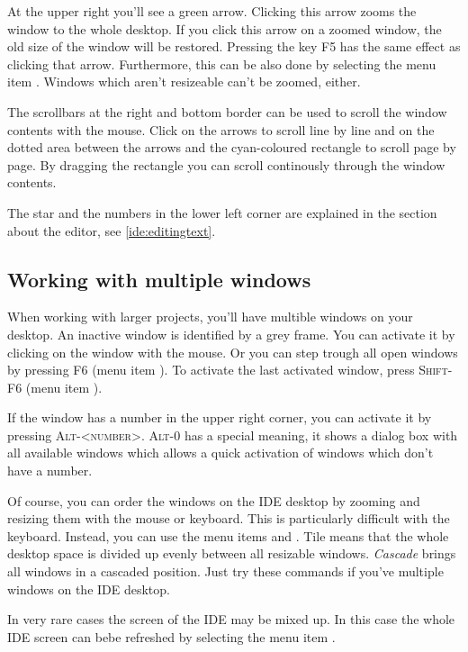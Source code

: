 At the upper right you'll see a green arrow. Clicking this arrow
zooms the window to the whole desktop. If you click this arrow on
a zoomed window, the old size of the window will be restored. Pressing
the key \textsc{F5} has the same effect as clicking that arrow. Furthermore,
this can be also done by selecting the menu item .
Windows which aren't resizeable can't be zoomed, either.

The scrollbars at the right and bottom border can be used to scroll
the window contents with the mouse. Click on the arrows to scroll
line by line and on the dotted area between the arrows and the
cyan-coloured
rectangle to scroll page by page. By dragging the rectangle you can
scroll continously through the window contents.

The star and the numbers in the lower left corner
are explained in the section about the editor, see \ref{ide:editingtext}.

\subsection{Working with multiple windows}
When working with larger projects, you'll have multible windows on your
desktop. An inactive window is identified by a grey frame. You can
activate it by clicking on the window with the mouse. Or you can
step trough all open windows by pressing \textsc{F6}
(menu item ).
To activate the last activated window, press \textsc{Shift-F6}
(menu item ).

If the window has a number in the upper
right corner, you can activate it by pressing \textsc{Alt-<number>}.
\textsc{Alt-0} has a special meaning,
it shows a dialog box with all available
windows which allows a quick activation of windows which don't have a
number.

Of course, you can order the windows on the IDE desktop by zooming and
resizing them with the mouse or keyboard. This is particularly difficult
with the keyboard. Instead, you can use the menu items
 and . Tile means that the
whole desktop space is divided up evenly between all resizable
windows. \emph{Cascade} brings
all windows in a cascaded position. Just try these commands if you've
multiple windows on the IDE desktop.

In very rare cases the screen of the IDE may be mixed up. In this
case the whole IDE screen can bebe refreshed by selecting
the menu item .

